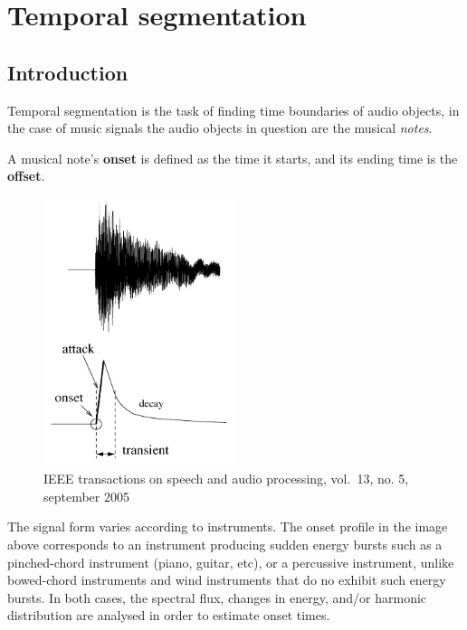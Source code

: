 \documentclass[american,]{article}
\begin{document}
\pagebreak

\hypertarget{temporal-segmentation}{%
\section{Temporal segmentation}\label{temporal-segmentation}}

\hypertarget{introduction-2}{%
\subsection{Introduction}\label{introduction-2}}

Temporal segmentation is the task of finding time boundaries
of audio objects, in the case of music signals the audio
objects in question are the musical \emph{notes}.

A musical note's \textbf{onset} is defined as the time it starts,
and its ending time is the \textbf{offset}.

\begin{figure}
\centering
\includegraphics[width=0.5\textwidth,height=\textheight]{img/onset.png}
\caption{IEEE transactions on speech and audio processing, vol.~13, no. 5, september 2005}
\end{figure}

The signal form varies according to instruments.
The onset profile in the image above corresponds to
an instrument producing sudden energy bursts such as
a pinched-chord instrument (piano, guitar, etc),
or a percussive instrument,
unlike bowed-chord instruments and wind instruments
that do no exhibit such energy bursts.
In both cases, the spectral flux, changes in energy,
and/or harmonic distribution are analysed in order
to estimate onset times.
\end{document}
